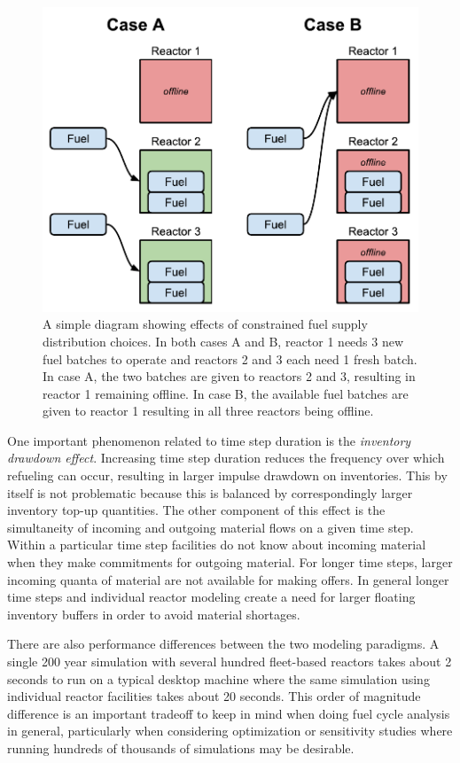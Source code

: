 \documentclass{style}
\begin{document}
\begin{figure}[h]
    \centering
    \includegraphics[width=0.8\columnwidth]{exp2/fuel-sharing.pdf}
    \caption[The fuel sharing effect]{
        A simple diagram showing effects of constrained fuel supply
        distribution choices. In both cases A and B, reactor 1 needs 3 new
        fuel batches to operate and reactors 2 and 3 each need 1 fresh batch.
        In case A, the two batches are given to reactors 2 and 3, resulting in
        reactor 1 remaining offline. In case B, the available fuel batches are
        given to reactor 1 resulting in all three reactors being offline.
    }
    \label{fig:fuel-sharing}
\end{figure}

One important phenomenon related to time step duration is the \emph{inventory
drawdown effect}.  Increasing time step duration reduces the frequency over
which refueling can occur, resulting in larger impulse drawdown on
inventories. This by itself is not problematic because this is balanced by
correspondingly larger inventory top-up quantities.  The other component of
this effect is the simultaneity of incoming and outgoing material flows on a
given time step.  Within a particular time step facilities do not know about
incoming material when they make commitments for outgoing material.  For
longer time steps, larger incoming quanta of material are not available for
making offers. In general longer time steps and individual reactor modeling
create a need for larger floating inventory buffers in order to avoid
material shortages.

There are also performance differences between the two modeling paradigms.  A
single 200 year simulation with several hundred fleet-based reactors takes
about 2 seconds to run on a typical desktop machine where the same simulation
using individual reactor facilities takes about 20 seconds.  This order of
magnitude difference is an important tradeoff to keep in mind when doing fuel
cycle analysis in general, particularly when considering optimization or
sensitivity studies where running hundreds of thousands of simulations may be
desirable.
\end{document}
